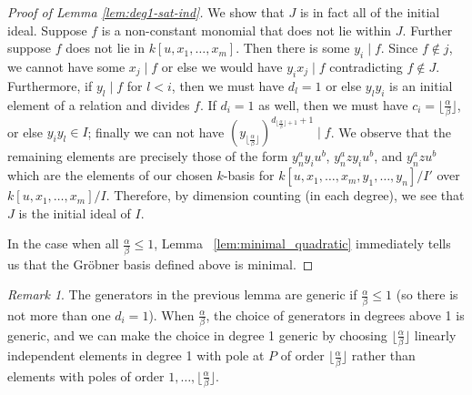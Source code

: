 \documentclass{amsart}
\theoremstyle{plain}
\theoremstyle{definition}
\theoremstyle{remark}
\newtheorem{rem}[thm]{Remark}
\numberwithin{equation}{section}
\begin{document}
\begin{proof}[Proof of Lemma \ref{lem:deg1-sat-ind}]
We show that $J$ is in fact all of the initial ideal. Suppose
$f$ is a non-constant monomial that does not lie within $J$.
Further suppose $f$ does not lie in $k[u, x_1, \ldots, x_m]$. Then
there is some $y_i \mid f$. Since $f \not\in j$, we cannot have
some $x_j \mid f$ or else we would have $y_i x_j \mid f$
contradicting $f \not\in J$. Furthermore, if $y_l \mid f$ for $l <
i$, then we must have $d_l = 1$ or else $y_l y_i$ is an initial
element of a relation and divides $f$. If $d_i = 1$ as well, then
we must have $c_i = \lfloor \frac{\alpha} {\beta} \rfloor$, or else
$y_i y_l \in I$; finally we can not have $(y_{\lfloor \frac{\alpha}{
\beta} \rfloor})^{d_{\lfloor \frac{\alpha}{\beta} \rfloor + 1} + 1} \mid
f$. We observe that the remaining elements are precisely those of
the form $y_n^a y_i u^b$, $y_n^a z y_i u^b$, and $y_n^a z u^b$
which are the elements of our chosen $k$-basis for $k[u, x_1, \ldots
, x_m, y_1, \ldots, y_n]/I'$ over $k[u, x_1, \ldots, x_m]/I$.
Therefore, by dimension counting (in each degree), we see that $J$
is the initial ideal of $I$. 

In the case when all $\frac{\alpha}{\beta}\le 1$, Lemma
~\ref{lem:minimal_quadratic} immediately tells us that the Gr\"{o}bner
basis defined above is minimal.
\end{proof}

\begin{rem}\label{rem:sat-1-gen-lem-generic}
The generators in the previous lemma are generic if $\frac{\alpha}{\beta}\le 1$ (so there is not more than one $d_i=1$).  When $\frac{\alpha}{\beta}$, the choice of generators in degrees above 1 is generic, and we can make the choice in degree 1 generic by choosing $\lfloor \frac{\alpha}{\beta}\rfloor$ linearly independent elements in degree 1 with pole at $P$ of order $\lfloor \frac{\alpha}{\beta}\rfloor$ rather than elements with poles of order $1, \ldots, \lfloor \frac{\alpha}{\beta}\rfloor$.
\end{rem}
\end{document}
